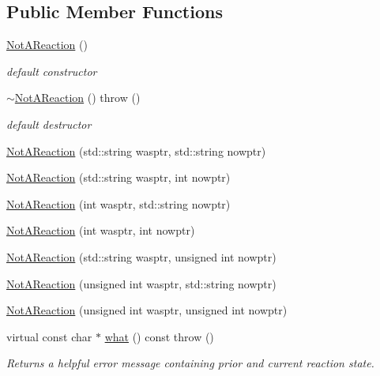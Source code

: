 \subsection*{Public Member Functions}
\begin{DoxyCompactItemize}
\item 
\mbox{\label{classpyne_1_1rxname_1_1_not_a_reaction_abb889337afdab53c131adf5702fb16d0}} 
\hyperlink{classpyne_1_1rxname_1_1_not_a_reaction_abb889337afdab53c131adf5702fb16d0}{Not\+A\+Reaction} ()
\begin{DoxyCompactList}\small\item\em default constructor \end{DoxyCompactList}\item 
\mbox{\label{classpyne_1_1rxname_1_1_not_a_reaction_a2a34cc0de45875c17c004acff20dc535}} 
\hyperlink{classpyne_1_1rxname_1_1_not_a_reaction_a2a34cc0de45875c17c004acff20dc535}{$\sim$\+Not\+A\+Reaction} ()  throw ()
\begin{DoxyCompactList}\small\item\em default destructor \end{DoxyCompactList}\item 
\hyperlink{classpyne_1_1rxname_1_1_not_a_reaction_a64f23630722811847d030ae0358f959f}{Not\+A\+Reaction} (std\+::string wasptr, std\+::string nowptr)
\item 
\hyperlink{classpyne_1_1rxname_1_1_not_a_reaction_a32de94daecf33a00055c8ac7ada718d7}{Not\+A\+Reaction} (std\+::string wasptr, int nowptr)
\item 
\hyperlink{classpyne_1_1rxname_1_1_not_a_reaction_a828c48bf08dd96121ec83c6cced3063b}{Not\+A\+Reaction} (int wasptr, std\+::string nowptr)
\item 
\hyperlink{classpyne_1_1rxname_1_1_not_a_reaction_a8d16f260eab4fbbc7a5a14b48ce5580d}{Not\+A\+Reaction} (int wasptr, int nowptr)
\item 
\hyperlink{classpyne_1_1rxname_1_1_not_a_reaction_a9f3cea1e2ffd856bd3111569482244d2}{Not\+A\+Reaction} (std\+::string wasptr, unsigned int nowptr)
\item 
\hyperlink{classpyne_1_1rxname_1_1_not_a_reaction_ab5ff27c0ce93ac29da63ab32e7fa44e3}{Not\+A\+Reaction} (unsigned int wasptr, std\+::string nowptr)
\item 
\hyperlink{classpyne_1_1rxname_1_1_not_a_reaction_a7e0b63801e38b5d2c59edd635817fb80}{Not\+A\+Reaction} (unsigned int wasptr, unsigned int nowptr)
\item 
\mbox{\label{classpyne_1_1rxname_1_1_not_a_reaction_a079f400912bb9b18d05b894c94a657c9}} 
virtual const char $\ast$ \hyperlink{classpyne_1_1rxname_1_1_not_a_reaction_a079f400912bb9b18d05b894c94a657c9}{what} () const  throw ()
\begin{DoxyCompactList}\small\item\em Returns a helpful error message containing prior and current reaction state. \end{DoxyCompactList}\end{DoxyCompactItemize}


